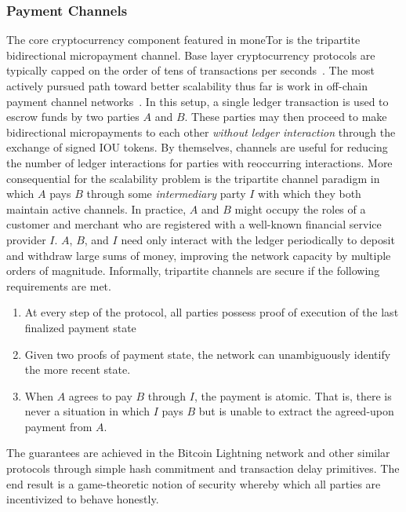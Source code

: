 \subsubsection{Payment Channels} The core cryptocurrency component featured in moneTor
is the tripartite bidirectional micropayment channel. Base layer cryptocurrency
protocols are typically capped on the order of tens of transactions per
seconds~\cite{team2018blockchain}. The most actively pursued path toward better
scalability thus far is work in off-chain payment channel
networks~\cite{poon2016bitcoin}. In this setup, a single ledger transaction is
used to escrow funds by two parties $A$ and $B$. These parties may then proceed
to make bidirectional micropayments to each other \emph{without ledger
  interaction} through the exchange of signed IOU tokens. By themselves,
channels are useful for reducing the number of ledger interactions for parties
with reoccurring interactions. More consequential for the scalability problem is
the tripartite channel paradigm in which $A$ pays $B$ through some
\emph{intermediary} party $I$ with which they both maintain active channels. In
practice, $A$ and $B$ might occupy the roles of a customer and merchant who are
registered with a well-known financial service provider $I$. $A$, $B$, and $I$
need only interact with the ledger periodically to deposit and withdraw large sums of
money, improving the network capacity by multiple orders of
magnitude. Informally, tripartite channels are secure if the following
requirements are met.

\begin{enumerate}
\item At every step of the protocol, all parties possess proof of execution of
  the last finalized payment state
\item Given two proofs of payment state, the network can unambiguously identify
  the more recent state.
\item When $A$ agrees to pay $B$ through $I$, the payment is atomic. That is,
  there is never a situation in which $I$ pays $B$ but is unable to extract the
  agreed-upon payment from $A$.
\end{enumerate}

The guarantees are achieved in the Bitcoin Lightning network and other similar
protocols through simple hash commitment and transaction delay primitives. The
end result is a game-theoretic notion of security whereby which all parties are
incentivized to behave honestly.

